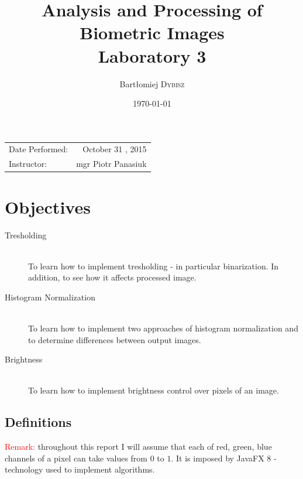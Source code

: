 \documentclass{article}
\title{Analysis and Processing of Biometric Images \\ Laboratory 3} %
\author{Bartłomiej \textsc{Dybisz}} %
\date{\today} %
\begin{document}
\maketitle %

\begin{center}
\begin{tabular}{l r}
Date Performed: & October 31 , 2015 \\ %
Instructor: & mgr Piotr Panasiuk %
\end{tabular}
\end{center}



\section{Objectives}

\begin{description}
\item[Tresholding] \hfill \\
To learn how to implement tresholding - in particular binarization. In addition, to see how it affects processed image.
\item[Histogram Normalization] \hfill \\
To learn how to implement two approaches of histogram normalization and to determine differences between output images.
\item[Brightness] \hfill \\
To learn how to implement brightness control over pixels of an image. 
\end{description}

\subsection{Definitions}
\label{definitions}
\textcolor{red}{Remark:} throughout this report I will assume that each of red, green, blue channels of a pixel can take values from $0$ to $1$. It is imposed by JavaFX 8 - technology used to implement algorithms.
\end{document}
